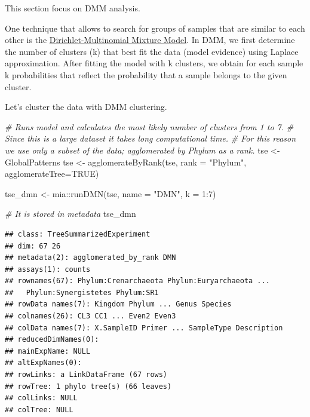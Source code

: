 \documentclass[
]{book}
\newenvironment{Shaded}{\begin{snugshade}}{\end{snugshade}}
\newcommand{\AttributeTok}[1]{\textcolor[rgb]{0.77,0.63,0.00}{#1}}
\newcommand{\CommentTok}[1]{\textcolor[rgb]{0.56,0.35,0.01}{\textit{#1}}}
\newcommand{\ConstantTok}[1]{\textcolor[rgb]{0.00,0.00,0.00}{#1}}
\newcommand{\DecValTok}[1]{\textcolor[rgb]{0.00,0.00,0.81}{#1}}
\newcommand{\FunctionTok}[1]{\textcolor[rgb]{0.00,0.00,0.00}{#1}}
\newcommand{\NormalTok}[1]{#1}
\newcommand{\OtherTok}[1]{\textcolor[rgb]{0.56,0.35,0.01}{#1}}
\newcommand{\SpecialCharTok}[1]{\textcolor[rgb]{0.00,0.00,0.00}{#1}}
\newcommand{\StringTok}[1]{\textcolor[rgb]{0.31,0.60,0.02}{#1}}
\begin{document}
This section focus on DMM analysis.

One technique that allows to search for groups of samples that are
similar to each other is the \href{https://journals.plos.org/plosone/article?id=10.1371/journal.pone.0030126}{Dirichlet-Multinomial Mixture
Model}. In
DMM, we first determine the number of clusters (k) that best fit the
data (model evidence) using Laplace approximation. After fitting the
model with k clusters, we obtain for each sample k probabilities that
reflect the probability that a sample belongs to the given cluster.

Let's cluster the data with DMM clustering.

\begin{Shaded}
\begin{Highlighting}[]
\CommentTok{\# Runs model and calculates the most likely number of clusters from 1 to 7.}
\CommentTok{\# Since this is a large dataset it takes long computational time.}
\CommentTok{\# For this reason we use only a subset of the data; agglomerated by Phylum as a rank.}
\NormalTok{tse }\OtherTok{\textless{}{-}}\NormalTok{ GlobalPatterns}
\NormalTok{tse }\OtherTok{\textless{}{-}} \FunctionTok{agglomerateByRank}\NormalTok{(tse, }\AttributeTok{rank =} \StringTok{"Phylum"}\NormalTok{, }\AttributeTok{agglomerateTree=}\ConstantTok{TRUE}\NormalTok{)}
\end{Highlighting}
\end{Shaded}

\begin{Shaded}
\begin{Highlighting}[]
\NormalTok{tse\_dmn }\OtherTok{\textless{}{-}}\NormalTok{ mia}\SpecialCharTok{::}\FunctionTok{runDMN}\NormalTok{(tse, }\AttributeTok{name =} \StringTok{"DMN"}\NormalTok{, }\AttributeTok{k =} \DecValTok{1}\SpecialCharTok{:}\DecValTok{7}\NormalTok{)}
\end{Highlighting}
\end{Shaded}

\begin{Shaded}
\begin{Highlighting}[]
\CommentTok{\# It is stored in metadata}
\NormalTok{tse\_dmn}
\end{Highlighting}
\end{Shaded}

\begin{verbatim}
## class: TreeSummarizedExperiment 
## dim: 67 26 
## metadata(2): agglomerated_by_rank DMN
## assays(1): counts
## rownames(67): Phylum:Crenarchaeota Phylum:Euryarchaeota ...
##   Phylum:Synergistetes Phylum:SR1
## rowData names(7): Kingdom Phylum ... Genus Species
## colnames(26): CL3 CC1 ... Even2 Even3
## colData names(7): X.SampleID Primer ... SampleType Description
## reducedDimNames(0):
## mainExpName: NULL
## altExpNames(0):
## rowLinks: a LinkDataFrame (67 rows)
## rowTree: 1 phylo tree(s) (66 leaves)
## colLinks: NULL
## colTree: NULL
\end{verbatim}
\end{document}
